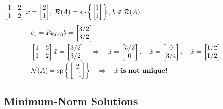\point $\displaystyle \bmat{1&2\\1&2}x = \bmat{2\\1}$, \qquad
$\Range(A) = \Span\left\{\bmat{1\\1}\right\}$, \qquad $b\notin\Range(A)$
\begin{align*}
&b_1 = P_{\Range(A)}b = \bmat{3/2\\3/2}\\
&\bmat{1&2\\1&2}\hat x = \bmat{3/2\\3/2}
\quad\Rightarrow\quad \hat x = \bmat{3/2\\0}, \quad \hat x = \bmat{0\\3/4}, \quad \hat x = \bmat{1/2\\1/2}\\
&\Null(A) = \Span\left\{\bmat{2\\-1}\right\}
\quad\Rightarrow\quad \hat x \text{ \key{is not unique!}}
\end{align*}

\subsection{Minimum-Norm Solutions}\label{ss:min-norm}
